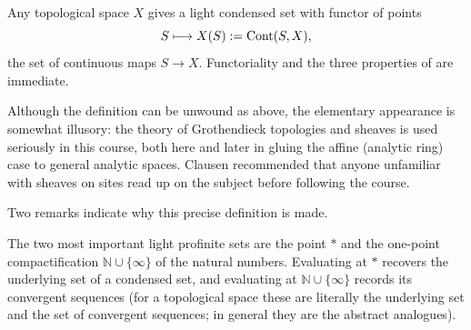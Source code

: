 \begin{example}
\label{ex:1:top-to-condensed}
Any topological space $X$ gives a light condensed set with functor of points
\begin{equation*}
S\longmapsto X(S):=\operatorname{Cont}(S,X),
\end{equation*}
the set of continuous maps $S\to X$. Functoriality and the three properties of
 are immediate.
\end{example}

\begin{remark}
\label{rmk:1:use-grothendieck}
Although the definition can be unwound as above, the elementary appearance is
somewhat illusory: the theory of Grothendieck topologies and sheaves is used
seriously in this course, both here and later in gluing the affine (analytic
ring) case to general analytic spaces. Clausen recommended that anyone unfamiliar
with sheaves on sites read up on the subject before following the course.
\end{remark}

Two remarks indicate why this precise definition is made.

\begin{remark}
\label{rmk:1:two-test-objects}
The two most important light profinite sets are the point $\ast$ and the
one-point compactification $\mathbb{N}\cup\{\infty\}$ of the natural numbers.
Evaluating at $\ast$ recovers the underlying set of a condensed set, and
evaluating at $\mathbb{N}\cup\{\infty\}$ records its convergent sequences (for a
topological space these are literally the underlying set and the set of
convergent sequences; in general they are the abstract analogues).
\end{remark}

